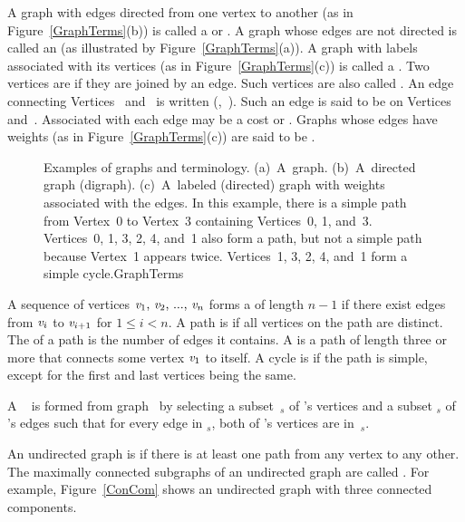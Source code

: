 A graph with edges directed from one vertex to another
(as in Figure~\ref{GraphTerms}(b)) is
called a  or .
A graph whose edges are not directed is called an
(as illustrated by Figure~\ref{GraphTerms}(a)).
A graph with labels associated with its vertices
(as in Figure~\ref{GraphTerms}(c)) is called a
.
Two vertices are  if they are joined by an edge.
Such vertices are also called .
An edge connecting Vertices~ and~ is written
(,~).
Such an edge is said to be  on Vertices~
and~.
Associated with each edge may be a cost or .
Graphs whose edges have weights (as in Figure~\ref{GraphTerms}(c))
are said to be .

\begin{figure}
\vspace{1pt}

{Examples of graphs and terminology.
(a)~A~graph.
(b)~A~directed graph (digraph).
(c)~A~labeled (directed) graph with weights associated with the
edges.
In this example, there is a simple path from Vertex~0 to Vertex~3
containing Vertices~0, 1, and~3.
Vertices~0, 1, 3, 2, 4, and~1 also form a path, but not a simple path
because Vertex~1 appears twice.
Vertices~1, 3, 2, 4, and~1 form a simple cycle.}{GraphTerms}
\bigskip
\bigskip
\bigskip
\end{figure}

A sequence of vertices \(\svar{v}_1$, $\svar{v}_2$, ..., $\svar{v}_n\)
forms a  of length \(n-1\) if there exist edges from
\({\textit{v}}_i\) to \({\textit{v}}_{i+1}\) for 
\(1 \leq i < n\).
A path is  if all vertices on the path are distinct.
The  of a path is the number of edges it contains.
A  is a path of length three or more that connects
some vertex \({\textit{v}}_1\) to itself.
A cycle is  if the path is simple, except for the first
and last vertices being the same.

A ~ is formed from graph~ by
selecting a subset~\(_s\) of 's vertices and a subset
\(_s\) of 's edges such that for every edge
 in \(_s\),
both of 's vertices are in~\(_s\).

An undirected graph is  if there is at least one path
from any vertex to any other.
The maximally connected subgraphs of an undirected graph are called
.
For example, Figure~\ref{ConCom} shows an undirected graph with three
connected components.

